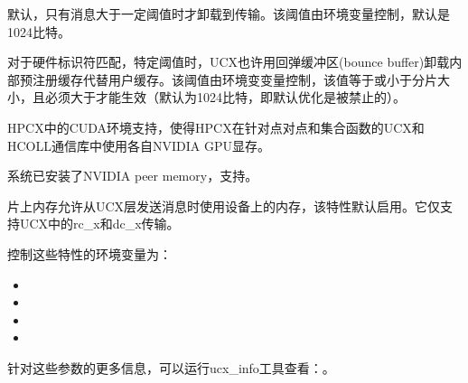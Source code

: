 \documentclass[a4paper,12pt,english]{sphinxmanual}
\begin{document}
\sphinxAtStartPar
默认，只有消息大于一定阈值时才卸载到传输。该阈值由环境变量控制，默认是1024比特。

\sphinxAtStartPar
对于硬件标识符匹配，特定阈值时，UCX也许用回弹缓冲区(bounce
buffer)卸载内部预注册缓存代替用户缓存。该阈值由环境变变量控制，该值等于或小于分片大小，且必须大于才能生效（默认为1024比特，即默认优化是被禁止的）。

\sphinxAtStartPar
{}

\sphinxAtStartPar
HPC\sphinxhyphen{}X中的CUDA环境支持，使得HPC\sphinxhyphen{}X在针对点对点和集合函数的UCX和HCOLL通信库中使用各自NVIDIA GPU显存。

\sphinxAtStartPar
系统已安装了NVIDIA peer memory，支持。

\sphinxAtStartPar
{}

\sphinxAtStartPar
片上内存允许从UCX层发送消息时使用设备上的内存，该特性默认启用。它仅支持UCX中的rc\_x和dc\_x传输。

\sphinxAtStartPar
控制这些特性的环境变量为：
\begin{itemize}
\item {} 
\sphinxAtStartPar
{}

\item {} 
\sphinxAtStartPar
{}

\item {} 
\sphinxAtStartPar
{}

\item {} 
\sphinxAtStartPar
{}

\end{itemize}

\sphinxAtStartPar
针对这些参数的更多信息，可以运行ucx\_info工具查看：。

\sphinxAtStartPar
{}
\end{document}
